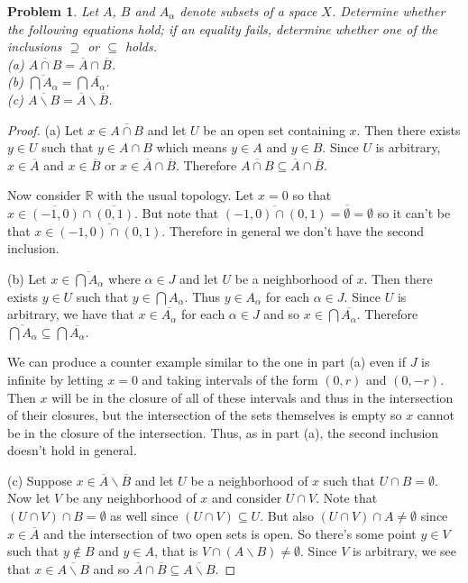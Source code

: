 \documentclass{article}
\newtheorem{problem}{Problem}
\begin{document}
\begin{problem}
Let $A$, $B$ and $A_{\alpha}$ denote subsets of a space $X$. Determine whether the following equations hold; if an equality fails, determine whether one of the inclusions $\supseteq$ or $\subseteq$ holds.\\
(a) $\overline{A \cap B} = \overline{A} \cap \overline{B}$.\\
(b) $\overline{\bigcap A_{\alpha}} = \bigcap \overline{A_{\alpha}}$.\\
(c) $\overline{A \backslash B} = \overline{A} \backslash \overline{B}$.
\end{problem}
\begin{proof}
(a) Let $x \in \overline{A \cap B}$ and let $U$ be an open set containing $x$. Then there exists $y \in U$ such that $y \in A \cap B$ which means $y \in A$ and $y \in B$. Since $U$ is arbitrary, $x \in \overline{A}$ and $x \in \overline{B}$ or $x \in \overline{A} \cap \overline{B}$. Therefore $\overline{A \cap B} \subseteq \overline{A} \cap \overline{B}$.

Now consider $\mathbb{R}$ with the usual topology. Let $x = 0$ so that $x \in \overline{(-1,0)} \cap \overline{(0,1)}$. But note that $\overline{(-1,0) \cap (0,1)} = \overline{\emptyset} = \emptyset$ so it can't be that $x \in \overline{(-1,0) \cap (0,1)}$. Therefore in general we don't have the second inclusion.

(b) Let $x \in \overline{\bigcap A_{\alpha}}$ where $\alpha \in J$ and let $U$ be a neighborhood of $x$. Then there exists $y \in U$ such that $y \in \bigcap A_{\alpha}$. Thus $y \in A_{\alpha}$ for each $\alpha \in J$. Since $U$ is arbitrary, we have that $x \in \overline{A_{\alpha}}$ for each $\alpha \in J$ and so $x \in \bigcap \overline{A_{\alpha}}$. Therefore $\overline{\bigcap A_{\alpha}} \subseteq \bigcap \overline{A_{\alpha}}$.

We can produce a counter example similar to the one in part (a) even if $J$ is infinite by letting $x=0$ and taking intervals of the form $(0,r)$ and $(0,-r)$. Then $x$ will be in the closure of all of these intervals and thus in the intersection of their closures, but the intersection of the sets themselves is empty so $x$ cannot be in the closure of the intersection. Thus, as in part (a), the second inclusion doesn't hold in general.

(c) Suppose $x \in \overline{A} \backslash \overline{B}$ and let $U$ be a neighborhood of $x$ such that $U \cap B = \emptyset$. Now let $V$ be any neighborhood of $x$ and consider $U \cap V$. Note that $(U \cap V) \cap B = \emptyset$ as well since $(U \cap V) \subseteq U$. But also $(U \cap V) \cap A \neq \emptyset$ since $x \in \overline{A}$ and the intersection of two open sets is open. So there's some point $y \in V$ such that $y \notin B$ and $y \in A$, that is $V \cap (A \backslash B) \neq \emptyset$. Since $V$ is arbitrary, we see that $x \in \overline{A \backslash B}$ and so $\overline{A} \cap \overline{B} \subseteq \overline{A \backslash B}$.


\end{proof}
\end{document}
